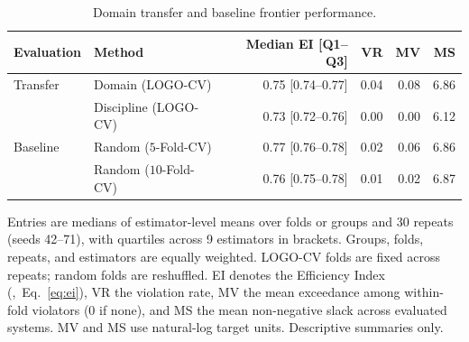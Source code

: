 \documentclass{article}
\begin{document}
\clearpage
\begin{table}[H]
\centering
\footnotesize
\captionsetup{position=top,skip=12pt}
\caption{Domain transfer and baseline frontier performance.}
\label{tab:si-transfer}
\begin{tabularx}{\linewidth}{@{}lXrrrr@{}}
\toprule
Evaluation & Method & Median EI [Q1--Q3] & VR & MV & MS \\
\midrule
Transfer & Domain (LOGO-CV) & 0.75 [0.74--0.77] & 0.04 & 0.08 & 6.86 \\
 & Discipline (LOGO-CV) & 0.73 [0.72--0.76] & 0.00 & 0.00 & 6.12 \\
\addlinespace
Baseline & Random ($5$-Fold-CV) & 0.77 [0.76--0.78] & 0.02 & 0.06 & 6.86 \\
 & Random ($10$-Fold-CV) & 0.76 [0.75--0.78] & 0.01 & 0.02 & 6.87 \\
\bottomrule
\end{tabularx}
\par\vspace{12pt}
\begin{minipage}{\linewidth}
\footnotesize
Entries are medians of estimator-level means over folds or groups and 30 repeats (seeds 42--71), with quartiles across 9 estimators in brackets. Groups, folds, repeats, and estimators are equally weighted. LOGO-CV folds are fixed across repeats; random folds are reshuffled. EI denotes the Efficiency Index (,~Eq.~\eqref{eq:ei}), VR the violation rate, MV the mean exceedance among within-fold violators (0 if none), and MS the mean non-negative slack across evaluated systems. MV and MS use natural-log target units. Descriptive summaries only.
\end{minipage}
\end{table}
\end{document}
